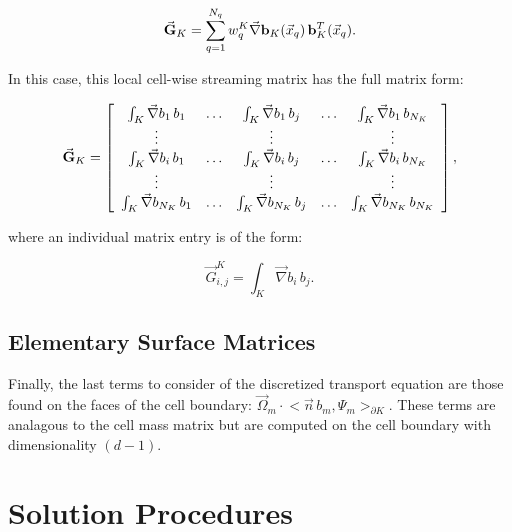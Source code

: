 \begin{equation}
\label{eq::Sn_streaming_matrix_numerical}
\vec{{\bf G}}_K =    \sum_{q = 1}^{N_q} w_{q}^K \vec{\nabla} {\bf b}_K (\vec{x}_q) \, {\bf b}_K^T (\vec{x}_q) .
\end{equation}

\noindent In this case, this local cell-wise streaming matrix has the full matrix form:

\begin{equation}
\label{eq::Sn_streaming_matrix_array}
\vec{{\bf G}}_K =   \left[
\begin{array} {ccccc}
	\int_K \vec{\nabla}b_1 \, b_1  & \ldots & \int_K \vec{\nabla}b_1 \, b_j  & \ldots & \int_K \vec{\nabla}b_1 \, b_{N_K} \\
	\vdots  &  & \vdots  &  & \vdots \\
	\int_K \vec{\nabla} b_i \, b_1  & \ldots & \int_K \vec{\nabla}b_i \, b_j  & \ldots & \int_K \vec{\nabla}b_i \, b_{N_K} \\
	\vdots  &  & \vdots  &  & \vdots \\
	\int_K \vec{\nabla} b_{N_K} \, b_1  & \ldots & \int_K \vec{\nabla} b_{N_K} \, b_j  & \ldots & \int_K \vec{\nabla} b_{N_K} \, b_{N_K} \\
\end{array}
\right] ,
\end{equation}

\noindent where an individual matrix entry is of the form:

\begin{equation}
\label{eq::Sn_streaming_matrix_entry}
\vec{G}_{i,j}^K =  \int_K \vec{\nabla}b_i \, b_j .
\end{equation}

\subsection{Elementary Surface Matrices}
\label{sec::Sn_Spatial_Surface}

Finally, the last terms to consider of the discretized transport equation are those found on the faces of the cell boundary: $  \vec{\Omega}_m \cdot  \Big<  \vec{n} \, b_m, \Psi_m  \Big>_{\partial K}$. These terms are analagous to the cell mass matrix but are computed on the cell boundary with dimensionality $(d-1)$.

\section{Solution Procedures}
\label{sec::Sn_Solution}

